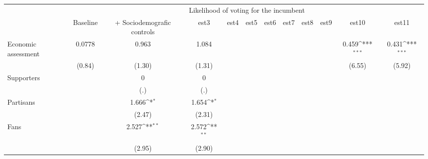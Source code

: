 {
\def\sym#1{\ifmmode^{#1}\else\(^{#1}\)\fi}
\begin{tabular}{l*{11}{c}}
\toprule
                &\multicolumn{11}{c}{Likelihood of voting for the incumbent}                                                                                                                                                     \\\cmidrule(lr){2-12}
                & Baseline         &+ Sociodemografic controls         &     est3         &     est4         &     est5         &     est6         &     est7         &     est8         &     est9         &    est10         &    est11         \\
\midrule
Economic assessment&   0.0778         &    0.963         &    1.084         &                  &                  &                  &                  &                  &                  &    0.459\sym{***}&    0.431\sym{***}\\
                &   (0.84)         &   (1.30)         &   (1.31)         &                  &                  &                  &                  &                  &                  &   (6.55)         &   (5.92)         \\
Supporters      &                  &        0         &        0         &                  &                  &                  &                  &                  &                  &                  &                  \\
                &                  &      (.)         &      (.)         &                  &                  &                  &                  &                  &                  &                  &                  \\
Partisans       &                  &    1.666\sym{*}  &    1.654\sym{*}  &                  &                  &                  &                  &                  &                  &                  &                  \\
                &                  &   (2.47)         &   (2.31)         &                  &                  &                  &                  &                  &                  &                  &                  \\
Fans            &                  &    2.527\sym{**} &    2.572\sym{**} &                  &                  &                  &                  &                  &                  &                  &                  \\
                &                  &   (2.95)         &   (2.90)         &                  &                  &                  &                  &                  &                  &                  &                  \\

\end{tabular}}
